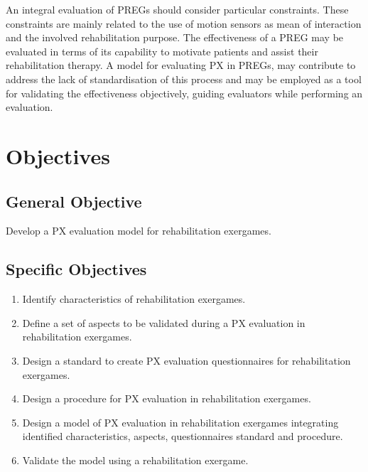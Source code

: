 An integral evaluation of \acp{PREG} should consider particular constraints. These constraints are mainly related to the use of motion sensors as mean of interaction \autocite{Wiemeyer2015,Nijholt2008} and the involved rehabilitation purpose. The effectiveness of a \ac{PREG} may be evaluated in terms of its capability to motivate patients and assist their rehabilitation therapy. A model for evaluating \ac{PX} in \acp{PREG}, may contribute to address the lack of standardisation of this process and may be employed as a tool for validating the effectiveness objectively, guiding evaluators while performing an evaluation.




\section{Objectives}\label{sec:objectives}

\subsection{General Objective} 
Develop a \ac{PX} evaluation model for rehabilitation exergames.

\subsection{Specific Objectives}
\begin{enumerate}
\item Identify characteristics of rehabilitation exergames.
\item Define a set of aspects to be validated during a \ac{PX} evaluation in rehabilitation exergames.
\item Design a standard to create \ac{PX} evaluation questionnaires for rehabilitation exergames.
\item Design a procedure for \ac{PX} evaluation in rehabilitation exergames.
\item Design a model of \ac{PX} evaluation in rehabilitation exergames integrating identified characteristics, aspects, questionnaires standard and procedure.
\item Validate the model using a rehabilitation exergame.
\end{enumerate}





